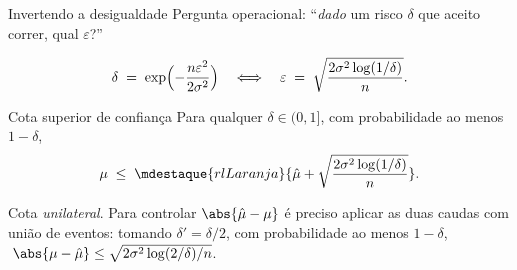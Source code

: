 \documentclass[aspectratio=169, 10pt]{beamer}
\newcommand{\muhat}{\hat{\mu}}
\begin{document}
\begin{frame}{Invertendo a desigualdade}
  Pergunta operacional: ``\emph{dado} um risco $\delta$ que aceito correr,
  qual $\varepsilon$?''

  \[
    \delta \;=\; \exp\Bigl(-\frac{n\varepsilon^2}{2\sigma^2}\Bigr)
    \quad\Longleftrightarrow\quad
    \varepsilon \;=\; \sqrt{\frac{2\sigma^2 \log(1/\delta)}{n}}.
  \]

  \begin{teobox}{Cota superior de confiança}
    Para qualquer $\delta \in (0,1]$, com probabilidade ao menos
    $1 - \delta$,
    \[
      \mu \;\le\; \mdestaque{rlLaranja}{\muhat + \sqrt{\frac{2\sigma^2\log(1/\delta)}{n}}}.
    \]
  \end{teobox}

  \begin{alertabox}
    Cota \emph{unilateral}. Para controlar $\abs{\muhat - \mu}$ é preciso
    aplicar as duas caudas com união de eventos: tomando
    $\delta' = \delta/2$, com probabilidade ao menos $1 - \delta$,
    $\;\abs{\mu - \muhat} \le \sqrt{2\sigma^2\log(2/\delta)/n}$.
  \end{alertabox}
\end{frame}
\end{document}
